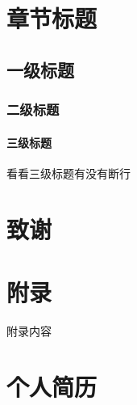 \documentclass{tjumaster}
\begin{document}
\section{章节标题}

\subsection{一级标题}
\subsubsection{二级标题}
\paragraph{三级标题}
看看三级标题有没有断行\\



\section*{致谢}








\appendix
\section*{附录}
附录内容


\section*{个人简历}
\end{document}

